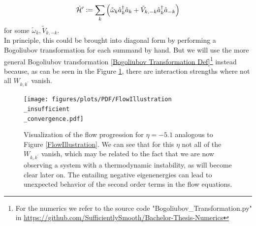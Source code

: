 \begin{equation}
\hat{\mathcal{H}}^\prime \vcentcolon= \sum\limits_{k}\left(\tilde\omega_k \hat a^\dagger_k\hat a_k + \tilde V_{k,-k}\hat a^\dagger_k\hat a_{-k}\right)
\end{equation}
for some $\tilde\omega_k,\tilde V_{k,-k}$.\\
In principle, this could be brought into diagonal form by performing a Bogoliubov transformation for each summand by hand. But we will use the more general Bogoliubov transformation \ref{Bogoliubov Transformation Def}\footnote{For the numerics we refer to the source code "Bogoliubov\_Transformation.py" in \url{https://github.com/SufficientlySmooth/Bachelor-Thesis-Numerics}} instead because, as can be seen in the Figure \ref{FlowIllustrationInsufficient}, there are interaction strengths where not all $W_{k,k^\prime}$ vanish.
\begin{figure}[H]
    \centering
    \texttt{[image: figures/plots/PDF/FlowIllustration\\\_insufficient\\\_convergence.pdf]}
    \caption[Flow Visualization for $\eta=-5.1$]{Visualization of the flow progression for $\eta=-5.1$ analogous to Figure \ref{FlowIllustration}. We can see that for this $\eta$ not all of the $W_{k,k^\prime}$ vanish, which may be related to the fact that we are now observing a system with a thermodynamic instability, as will become clear later on. The entailing negative eigenenergies can lead to unexpected behavior of the second order terms in the flow equations.}
    \label{FlowIllustrationInsufficient}
\end{figure}

